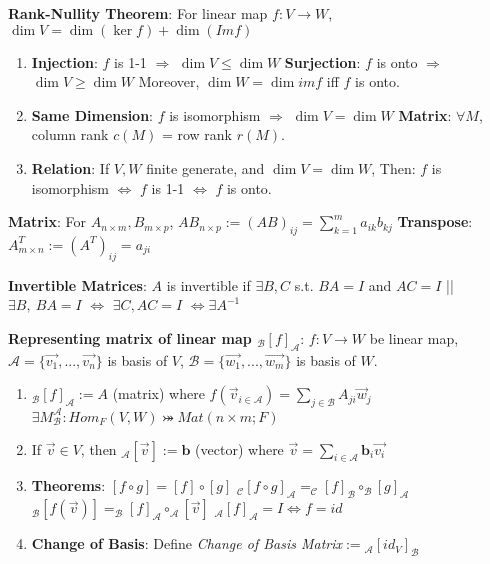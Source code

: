 \documentclass[9pt]{article}
\begin{document}
\textbf{Rank-Nullity Theorem}: For linear map $f:V\to W$, $\dim V=\dim(\ker f)+\dim(Im f)$ \quad \quad {}

\begin{enumerate}[itemsep=-2pt, topsep=-2pt]
    \item \textbf{Injection}: $f$ is 1-1 $\Rightarrow$ $\dim V \leq \dim W$ \quad \textbf{Surjection}: $f$ is onto $\Rightarrow$ $\dim V \geq \dim W$ \quad Moreover, $\dim W=\dim imf$ iff $f$ is onto.
    \item \textbf{Same Dimension}: {\small $f$ is isomorphism $\Rightarrow$ $\dim V=\dim W$} \quad \quad \quad \textbf{Matrix}: $\forall M$, column rank $c(M)$ = row rank $r(M)$.
    \item \textbf{Relation}: {\small If $V,W$ finite generate, and $\dim V=\dim W$, \quad Then: $f$ is isomorphism $\Leftrightarrow$ $f$ is 1-1 $\Leftrightarrow$ $f$ is onto.}
\end{enumerate}

\textbf{Matrix}: For $A_{n\times m},B_{m\times p}$, $AB_{n\times p}:=(AB)_{ij}=\sum_{k=1}^{m}a_{ik}b_{kj}$ \quad \textbf{Transpose}: $A^T_{m\times n}:=(A^T)_{ij}=a_{ji}$

\textbf{Invertible Matrices}: {\small $A$ is invertible if $\exists B,C$ s.t. $BA=I$ and $AC=I$ \quad || \quad $\exists B, \ BA=I$ $\Leftrightarrow$ $\exists C,AC=I$ $\Leftrightarrow \exists A^{-1}$} 

\textbf{Representing matrix of linear map $_{\mathcal{B}}[f]_{\mathcal{A}}$}: $f:V\to W$ be linear map, $\mathcal{A}=\{\vec{v_1},...,\vec{v_n}\}$ is basis of $V$, $\mathcal{B}=\{\vec{w_1},...,\vec{w_m}\}$ is basis of $W$.

\begin{enumerate}[itemsep=-2pt, topsep=-2pt]
    \item $_{\mathcal{B}}[f]_{\mathcal{A}}:=A$ {\small (matrix)} where $f(\vec{v}_{i\in\mathcal{A}})=\sum_{j\in\mathcal{B}}A_{ji}\vec{w}_j$ \quad \quad $\exists M^{\mathcal{A}}_{\mathcal{B}}:Hom_{F}(V,W)\bij Mat(n\times m;F)$
    \item If $\vec{v}\in V$, then $_{\mathcal{A}}[\vec{v}]:=\mathbf{b}$ {\small (vector)} where $\vec{v}=\sum_{i\in\mathcal{A}}\mathbf{b}_i\vec{v_i}$
    \item \textbf{Theorems}: $[f\circ g]=[f]\circ[g]$ \quad \quad $_{\mathcal{C}}[f\circ g]_{\mathcal{A}}=_{\mathcal{C}}[f]_{\mathcal{B}}\circ_{\mathcal{B}}[g]_{\mathcal{A}}$ \quad \quad $_{\mathcal{B}}[f(\vec{v})]=_{\mathcal{B}}[f]_{\mathcal{A}}\circ_{\mathcal{A}}[\vec{v}]$ \quad \quad $_{\mathcal{A}}[f]_{\mathcal{A}}=I\Leftrightarrow f=id$
    \item \textbf{Change of Basis}: {\small Define \textit{Change of Basis Matrix}$:=$$_{\mathcal{A}}[id_V]_{\mathcal{B}}$ \quad {}}
\end{enumerate}
\end{document}
